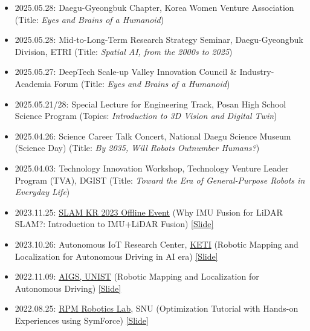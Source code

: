\begin{itemize}[label=$\cdot$]
    \item 2025.05.28: Daegu-Gyeongbuk Chapter, Korea Women Venture Association  
    \hfill (Title: \textit{Eyes and Brains of a Humanoid})
    
    \item 2025.05.28: Mid-to-Long-Term Research Strategy Seminar, Daegu-Gyeongbuk Division, ETRI  
    \hfill (Title: \textit{Spatial AI, from the 2000s to 2025})
    
    \item 2025.05.27: DeepTech Scale-up Valley Innovation Council \& Industry-Academia Forum  
    \hfill (Title: \textit{Eyes and Brains of a Humanoid})
    
    \item 2025.05.21/28: Special Lecture for Engineering Track, Posan High School Science Program  
    \hfill (Topics: \textit{Introduction to 3D Vision and Digital Twin})
    
    \item 2025.04.26: Science Career Talk Concert, National Daegu Science Museum (Science Day)  
    \hfill (Title: \textit{By 2035, Will Robots Outnumber Humans?})
    
    \item 2025.04.03: Technology Innovation Workshop, Technology Venture Leader Program (TVA), DGIST  
    \hfill (Title: \textit{Toward the Era of General-Purpose Robots in Everyday Life})

    \item 2023.11.25: \href{https://drive.google.com/file/d/1h5sMgkyGGA8X2gxJUEzWCSwX9RlujNpe/view?usp=sharing}{SLAM KR 2023 Offline Event} (Why IMU Fusion for LiDAR SLAM?: Introduction to IMU+LiDAR Fusion) \href{https://bit.ly/20231125_slamkr_giseopkim}{[Slide]}
    
    \item 2023.10.26: Autonomous IoT Research Center, \href{https://www.keti.re.kr/eng/main/main.php}{KETI} (Robotic Mapping and Localization for Autonomous Driving in AI era) \href{https://bit.ly/408J7XJ}{[Slide]}
    
    \item 2022.11.09: \href{https://ib.unist.ac.kr/robust-slam-simultaneous-localization-and-mapping-for-large-scale-urban-mapping-and-autonomous-driving/}{AIGS, UNIST} (Robotic Mapping and Localization for Autonomous Driving) \href{https://docs.google.com/presentation/d/1RLrrxGzzGWEgUQMvdWH0wNfsyn6ML2Hjw88PmgdrvlQ/edit?usp=sharing}{[Slide]}
    
    \item 2022.08.25: \href{https://rpm.snu.ac.kr/}{RPM Robotics Lab}, SNU (Optimization Tutorial with Hands-on Experiences using SymForce) \href{https://docs.google.com/presentation/d/1Z1FjnphgP60jTIa6da8vwhaAEzULefLrPQsJ4yBHAJA/edit?usp=sharing}{[Slide]}
    

\end{itemize}
